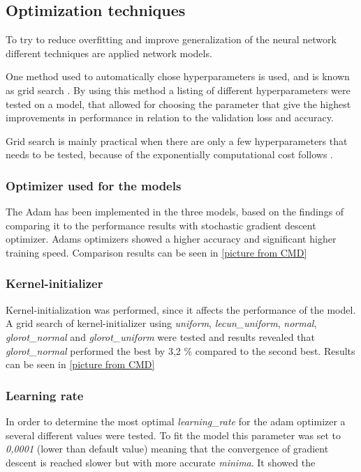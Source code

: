 \subsection{Optimization techniques}
To try to reduce overfitting and improve generalization of the neural network different techniques are applied network models.

One method used to automatically chose hyperparameters is used, and is known as grid search \citep{Goodfellow2016}. By using this method a listing of different hyperparameters were tested on a model, that allowed for choosing the parameter that give the highest improvements in performance in relation to the validation loss and accuracy.  

Grid search is mainly practical when there are only a few hyperparameters that needs to be tested, because of the exponentially computational cost follows \citep{Goodfellow2016}.   

\subsubsection{Optimizer used for the models}
The Adam has been implemented in the three models, based on the findings of comparing it to the performance results with stochastic gradient descent optimizer. Adams optimizers showed a higher accuracy and significant higher training speed. Comparison results can be seen in \ref{picture from CMD}

\subsubsection{Kernel-initializer}
Kernel-initialization was performed, since it affects the performance of the model.
A grid search of kernel-initializer using \textit{uniform}, \textit{lecun\_uniform}, \textit{normal}, \textit{glorot\_normal} and \textit{glorot\_uniform} were tested and results revealed that \textit{glorot\_normal} performed the best by 3,2 \% compared to the second best. Results can be seen in \ref{picture from CMD}

\subsubsection{Learning rate}
In order to determine the most optimal \textit{learning\_rate} for the adam optimizer a several different values were tested. To fit the model this parameter was set to \textit{0,0001} (lower than default value) meaning that the convergence of gradient descent is reached slower but with more accurate \textit{minima}. It showed the 


